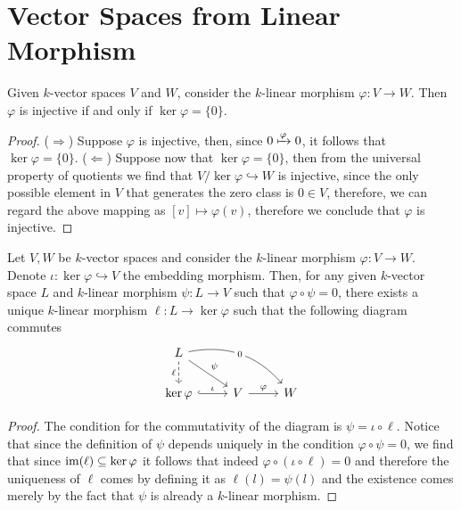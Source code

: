 \section{Vector Spaces from Linear Morphism}

\begin{proposition}
  Given \(k\)-vector spaces \(V\) and \(W\), consider the \(k\)-linear morphism
  \(\varphi : V \to W\). Then \(\varphi\) is injective if and only if \(\ker
  \varphi = \{0\}\).
\end{proposition}

\begin{proof}
  (\(\Rightarrow\)) Suppose \(\varphi\) is injective, then, since \(0 \xmapsto
  \varphi 0\), it follows that \(\ker \varphi = \{0\}\). (\(\Leftarrow\))
  Suppose now that \(\ker \varphi = \{0\}\), then from the universal property
  of quotients we find that \(V/\ker \varphi \hookrightarrow W\) is injective,
  since the only possible element in \(V\) that generates the zero class is \(0
  \in V\), therefore, we can regard the above mapping as \([v] \mapsto
  \varphi(v)\), therefore we conclude that \(\varphi\) is injective.
\end{proof}

\begin{theorem}
  Let \(V, W\) be \(k\)-vector spaces and consider the \(k\)-linear morphism
  \(\varphi : V \to W\). Denote \(\iota : \ker \varphi \hookrightarrow V\) the
  embedding morphism. Then, for any given \(k\)-vector space \(L\) and
  \(k\)-linear morphism \(\psi : L \to V\) such that \(\varphi \circ \psi = 0\),
  there exists a unique \(k\)-linear morphism \(\ell : L \to \ker \varphi\) such
  that the following diagram commutes
  \[
    \begin{tikzcd}
      L \ar[d, dashed, swap, "\ell"] \ar[dr, "\psi"] \ar[drr, bend left,
      "0" description] & & \\
      \ker \varphi \ar[r, hookrightarrow, "\iota"] &V \ar[r, "\varphi"] &W
    \end{tikzcd}
  \]
\end{theorem}

\begin{proof}
  The condition for the commutativity of the diagram is \(\psi = \iota \circ
  \ell\). Notice that since the definition of \(\psi\) depends uniquely in the
  condition \(\varphi \circ \psi = 0\), we find that since \(\operatorname{im}(\ell)
  \subseteq \ker \varphi\) it follows that indeed \(\varphi \circ (\iota \circ
  \ell) = 0\) and therefore the uniqueness of \(\ell\) comes by defining it as
  \(\ell(l) = \psi(l)\) and the existence comes merely by the fact that \(\psi\)
  is already a \(k\)-linear morphism.
\end{proof}

